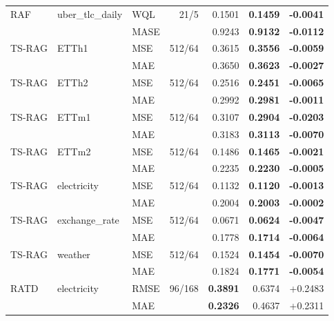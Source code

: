 \begin{longtable}{@{}lllrrrr@{}}
RAF & uber\_tlc\_daily & WQL & 21/5 & 0.1501 & \textbf{0.1459} & \textbf{-0.0041} \\
 &  & MASE &  & 0.9243 & \textbf{0.9132} & \textbf{-0.0112} \\
\midrule
TS-RAG & ETTh1 & MSE & 512/64 & 0.3615 & \textbf{0.3556} & \textbf{-0.0059} \\
 &  & MAE &  & 0.3650 & \textbf{0.3623} & \textbf{-0.0027} \\
TS-RAG & ETTh2 & MSE & 512/64 & 0.2516 & \textbf{0.2451} & \textbf{-0.0065} \\
 &  & MAE &  & 0.2992 & \textbf{0.2981} & \textbf{-0.0011} \\
TS-RAG & ETTm1 & MSE & 512/64 & 0.3107 & \textbf{0.2904} & \textbf{-0.0203} \\
 &  & MAE &  & 0.3183 & \textbf{0.3113} & \textbf{-0.0070} \\
TS-RAG & ETTm2 & MSE & 512/64 & 0.1486 & \textbf{0.1465} & \textbf{-0.0021} \\
 &  & MAE &  & 0.2235 & \textbf{0.2230} & \textbf{-0.0005} \\
TS-RAG & electricity & MSE & 512/64 & 0.1132 & \textbf{0.1120} & \textbf{-0.0013} \\
 &  & MAE &  & 0.2004 & \textbf{0.2003} & \textbf{-0.0002} \\
TS-RAG & exchange\_rate & MSE & 512/64 & 0.0671 & \textbf{0.0624} & \textbf{-0.0047} \\
 &  & MAE &  & 0.1778 & \textbf{0.1714} & \textbf{-0.0064} \\
TS-RAG & weather & MSE & 512/64 & 0.1524 & \textbf{0.1454} & \textbf{-0.0070} \\
 &  & MAE &  & 0.1824 & \textbf{0.1771} & \textbf{-0.0054} \\
\midrule
RATD & electricity & RMSE & 96/168 & \textbf{0.3891} & 0.6374 & +0.2483 \\
 &  & MAE &  & \textbf{0.2326} & 0.4637 & +0.2311 \\
\end{longtable}
\endgroup
